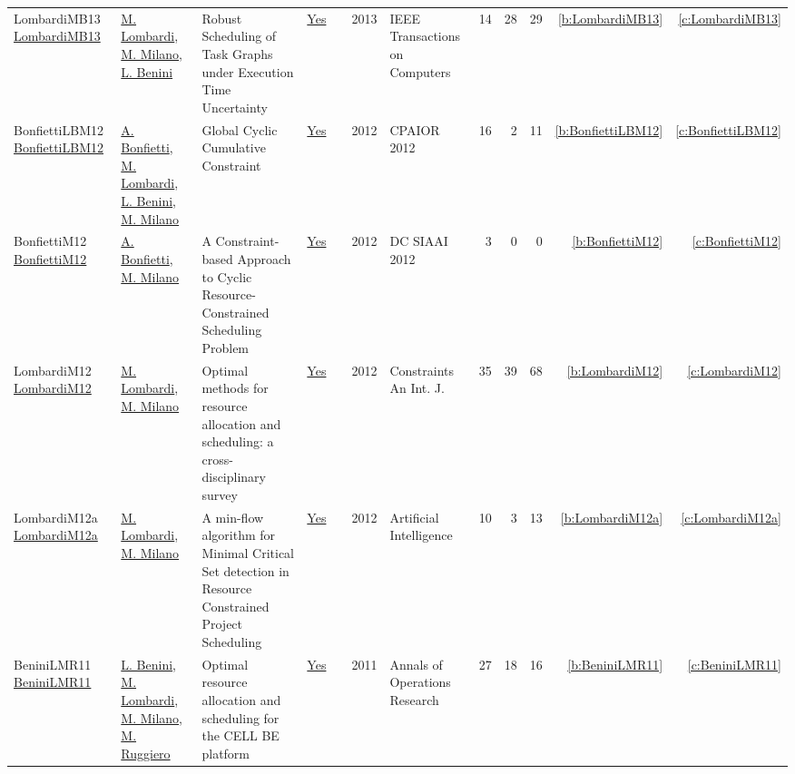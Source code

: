 {\begin{longtable}{>{\raggedright\arraybackslash}p{3cm}>{\raggedright\arraybackslash}p{6cm}>{\raggedright\arraybackslash}p{6.5cm}rrrp{2.5cm}rrrrr}
LombardiMB13 \href{http://dx.doi.org/10.1109/tc.2011.203}{LombardiMB13} & \hyperref[auth:a143]{M. Lombardi}, \hyperref[auth:a144]{M. Milano}, \hyperref[auth:a248]{L. Benini} & Robust Scheduling of Task Graphs under Execution Time Uncertainty & \href{works/LombardiMB13.pdf}{Yes} & \cite{LombardiMB13} & 2013 & IEEE Transactions on Computers & 14 & 28 & 29 & \ref{b:LombardiMB13} & \ref{c:LombardiMB13}\\
BonfiettiLBM12 \href{https://doi.org/10.1007/978-3-642-29828-8\_6}{BonfiettiLBM12} & \hyperref[auth:a204]{A. Bonfietti}, \hyperref[auth:a143]{M. Lombardi}, \hyperref[auth:a248]{L. Benini}, \hyperref[auth:a144]{M. Milano} & Global Cyclic Cumulative Constraint & \href{works/BonfiettiLBM12.pdf}{Yes} & \cite{BonfiettiLBM12} & 2012 & CPAIOR 2012 & 16 & 2 & 11 & \ref{b:BonfiettiLBM12} & \ref{c:BonfiettiLBM12}\\
BonfiettiM12 \href{https://ceur-ws.org/Vol-926/paper2.pdf}{BonfiettiM12} & \hyperref[auth:a204]{A. Bonfietti}, \hyperref[auth:a144]{M. Milano} & A Constraint-based Approach to Cyclic Resource-Constrained Scheduling Problem & \href{works/BonfiettiM12.pdf}{Yes} & \cite{BonfiettiM12} & 2012 & DC SIAAI 2012 & 3 & 0 & 0 & \ref{b:BonfiettiM12} & \ref{c:BonfiettiM12}\\
LombardiM12 \href{https://doi.org/10.1007/s10601-011-9115-6}{LombardiM12} & \hyperref[auth:a143]{M. Lombardi}, \hyperref[auth:a144]{M. Milano} & Optimal methods for resource allocation and scheduling: a cross-disciplinary survey & \href{works/LombardiM12.pdf}{Yes} & \cite{LombardiM12} & 2012 & Constraints An Int. J. & 35 & 39 & 68 & \ref{b:LombardiM12} & \ref{c:LombardiM12}\\
LombardiM12a \href{https://doi.org/10.1016/j.artint.2011.12.001}{LombardiM12a} & \hyperref[auth:a143]{M. Lombardi}, \hyperref[auth:a144]{M. Milano} & A min-flow algorithm for Minimal Critical Set detection in Resource Constrained Project Scheduling & \href{works/LombardiM12a.pdf}{Yes} & \cite{LombardiM12a} & 2012 & Artificial Intelligence & 10 & 3 & 13 & \ref{b:LombardiM12a} & \ref{c:LombardiM12a}\\
BeniniLMR11 \href{https://doi.org/10.1007/s10479-010-0718-x}{BeniniLMR11} & \hyperref[auth:a248]{L. Benini}, \hyperref[auth:a143]{M. Lombardi}, \hyperref[auth:a144]{M. Milano}, \hyperref[auth:a727]{M. Ruggiero} & Optimal resource allocation and scheduling for the {CELL} {BE} platform & \href{works/BeniniLMR11.pdf}{Yes} & \cite{BeniniLMR11} & 2011 & Annals of Operations Research & 27 & 18 & 16 & \ref{b:BeniniLMR11} & \ref{c:BeniniLMR11}\\

\end{longtable}}
